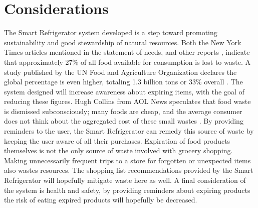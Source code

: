 \documentclass[11pt]{article} %
\begin{document}
\section{Considerations}
The Smart Refrigerator system developed is a step toward promoting sustainability and good stewardship of natural resources. Both the New York Times articles mentioned in the statement of needs, and other reports \cite{times, aol}, indicate that approximately 27\% of all food available for consumption is lost to waste. A study published by the UN Food and Agriculture Organization declares the global percentage is even higher, totaling 1.3 billion tons or 33\% overall \cite{dutch}. The system designed will increase awareness about expiring items, with the goal of reducing these figures. Hugh Collins from AOL News speculates that food waste is dismissed subconsciously; many foods are cheap, and the average consumer does not think about the aggregated cost of these small wastes \cite{aol}. By providing reminders to the user, the Smart Refrigerator can remedy this source of waste by keeping the user aware of all their purchases. Expiration of food products themselves is not the only source of waste involved with grocery shopping. Making unnecessarily frequent trips to a store for forgotten or unexpected items also wastes resources. The shopping list recommendations provided by the Smart Refrigerator will hopefully mitigate waste here as well. A final consideration of the system is health and safety, by providing reminders about expiring products the risk of eating expired products will hopefully be decreased. 
\end{document}
